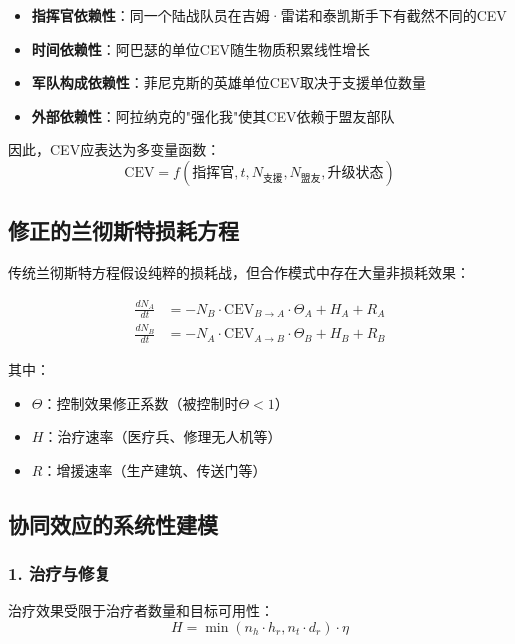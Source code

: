\documentclass[a4paper,12pt]{article}
\begin{document}
\begin{itemize}
\item \textbf{指挥官依赖性}：同一个陆战队员在吉姆·雷诺和泰凯斯手下有截然不同的CEV
\item \textbf{时间依赖性}：阿巴瑟的单位CEV随生物质积累线性增长
\item \textbf{军队构成依赖性}：菲尼克斯的英雄单位CEV取决于支援单位数量
\item \textbf{外部依赖性}：阿拉纳克的"强化我"使其CEV依赖于盟友部队
\end{itemize}

因此，CEV应表达为多变量函数：
\begin{equation}
\text{CEV} = f(\text{指挥官}, t, N_{支援}, N_{盟友}, \text{升级状态})
\end{equation}

\subsection{修正的兰彻斯特损耗方程}
传统兰彻斯特方程假设纯粹的损耗战，但合作模式中存在大量非损耗效果：

\begin{align}
\frac{dN_A}{dt} &= -N_B \cdot \text{CEV}_{B \rightarrow A} \cdot \Theta_A + H_A + R_A \\
\frac{dN_B}{dt} &= -N_A \cdot \text{CEV}_{A \rightarrow B} \cdot \Theta_B + H_B + R_B
\end{align}

其中：
\begin{itemize}
\item $\Theta$：控制效果修正系数（被控制时$\Theta < 1$）
\item $H$：治疗速率（医疗兵、修理无人机等）
\item $R$：增援速率（生产建筑、传送门等）
\end{itemize}

\subsection{协同效应的系统性建模}

\subsubsection{1. 治疗与修复}
治疗效果受限于治疗者数量和目标可用性：
\begin{equation}
H = \min(n_h \cdot h_r, n_t \cdot d_r) \cdot \eta
\end{equation}
\end{document}
